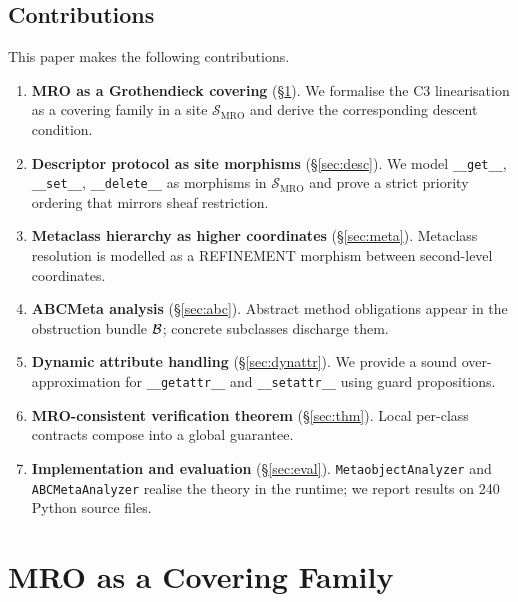\documentclass[11pt]{article}
\newcommand{\MROSite}{\mathcal{S}_{\mathrm{MRO}}} %
\newcommand{\Dget}{\texttt{\_\_get\_\_}}
\newcommand{\Dset}{\texttt{\_\_set\_\_}}
\newcommand{\Ddel}{\texttt{\_\_delete\_\_}}
\newcommand{\getattr}{\texttt{\_\_getattr\_\_}}
\newcommand{\setattr}{\texttt{\_\_setattr\_\_}}
\newcommand{\MetaAnalyzer}{\texttt{MetaobjectAnalyzer}}
\newcommand{\ABCAnalyzer}{\texttt{ABCMetaAnalyzer}}
\begin{document}
\subsection{Contributions}

This paper makes the following contributions.

\begin{enumerate}[leftmargin=1.5em]
  \item \textbf{MRO as a Grothendieck covering} (\S\ref{sec:mro}).
    We formalise the C3 linearisation as a covering family in a site
    $\MROSite$ and derive the corresponding descent condition.

  \item \textbf{Descriptor protocol as site morphisms} (\S\ref{sec:desc}).
    We model \Dget, \Dset, \Ddel{} as morphisms in $\MROSite$ and prove
    a strict priority ordering that mirrors sheaf restriction.

  \item \textbf{Metaclass hierarchy as higher coordinates}
    (\S\ref{sec:meta}).
    Metaclass resolution is modelled as a REFINEMENT morphism between
    second-level coordinates.

  \item \textbf{ABCMeta analysis} (\S\ref{sec:abc}).
    Abstract method obligations appear in the obstruction bundle
    $\mathcal{B}$; concrete subclasses discharge them.

  \item \textbf{Dynamic attribute handling} (\S\ref{sec:dynattr}).
    We provide a sound over-approximation for \getattr{} and
    \setattr{} using guard propositions.

  \item \textbf{MRO-consistent verification theorem} (\S\ref{sec:thm}).
    Local per-class contracts compose into a global guarantee.

  \item \textbf{Implementation and evaluation} (\S\ref{sec:eval}).
    \MetaAnalyzer{} and \ABCAnalyzer{} realise the theory in the
    \JuGeo{} runtime; we report results on 240 Python source files.
\end{enumerate}

\section{MRO as a Covering Family}\label{sec:mro}
\end{document}
